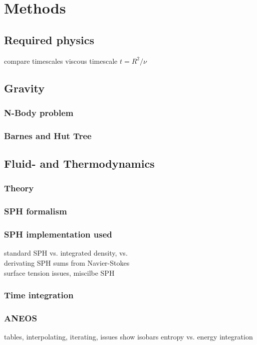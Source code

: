 \graphicspath{{./02figs/}}

\chapter{Methods}
%

\section{Required physics}
compare timescales
viscous timescale $t = R^2 / \nu$
\SSC 
\textsf{\SSC}

\section{Gravity}
\subsection{N-Body problem}
\subsection{Barnes and Hut Tree}

\section{Fluid- and Thermodynamics}
\subsection{Theory}
\subsection{SPH formalism}
\subsection{SPH implementation used}
standard SPH vs. integrated density, vs.\\
derivating SPH sums from Navier-Stokes\\
surface tension issues, miscilbe SPH
\subsection{Time integration}

\subsection{ANEOS}
tables, interpolating, iterating, issues
show isobars
entropy vs. energy integration

